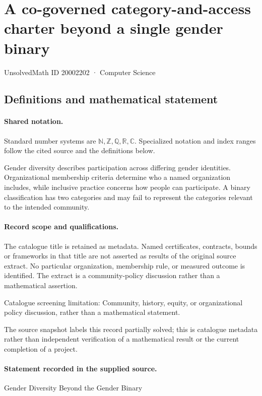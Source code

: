 \documentclass[11pt]{article}
\begin{document}
\setcounter{section}{20002201}
\section{A co-governed category-and-access charter beyond a single gender binary}\label{20002202}
{\small\sffamily UnsolvedMath ID 20002202 · Computer Science}
\subsection{Definitions and mathematical statement}

\paragraph{Shared notation.}Standard number systems are $\mathbb N,\mathbb Z,\mathbb Q,\mathbb R,\mathbb C$. Specialized notation and index ranges follow the cited source and the definitions below.


Gender diversity describes participation across differing gender identities. Organizational membership criteria determine who a named organization includes, while inclusive practice concerns how people can participate. A binary classification has two categories and may fail to represent the categories relevant to the intended community.
\paragraph{Record scope and qualifications.}
The catalogue title is retained as metadata. Named certificates, contracts, bounds or frameworks in that title are not asserted as results of the original source extract.
No particular organization, membership rule, or measured outcome is identified. The extract is a community-policy discussion rather than a mathematical assertion.

Catalogue screening limitation: Community, history, equity, or organizational policy discussion, rather than a mathematical statement.

The source snapshot labels this record partially solved; this is catalogue metadata rather than independent verification of a mathematical result or the current completion of a project.
\paragraph{Statement recorded in the supplied source.}
Gender Diversity Beyond the Gender Binary
\end{document}
